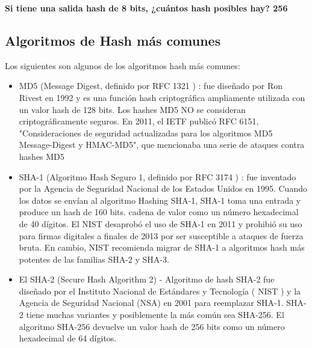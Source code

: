 \textbf{Si tiene una salida hash de 8 bits, ¿cuántos hash posibles hay? 256
}

\subsection{Algoritmos de Hash más comunes}

Los siguientes son algunos de los algoritmos hash más comunes: 
\begin{itemize}
    \item MD5 (Message Digest, definido por  RFC 1321 ) : fue diseñado por Ron Rivest en 1992 y es una función hash criptográfica ampliamente utilizada con un valor hash de 128 bits. Los hashes MD5 NO se consideran criptográficamente seguros. En 2011, el IETF publicó RFC 6151, "Consideraciones de seguridad actualizadas para los algoritmos MD5 Message-Digest y HMAC-MD5", que mencionaba una serie de ataques contra hashes MD5
\item SHA-1 (Algoritmo Hash Seguro 1, definido por  RFC 3174 ) :  fue inventado por la Agencia de Seguridad Nacional de los Estados Unidos en 1995.  Cuando los datos se envían al algoritmo Hashing SHA-1, SHA-1 toma una entrada y produce un hash de 160 bits. cadena de valor como un número hexadecimal de 40 dígitos. El NIST desaprobó el uso de SHA-1 en 2011 y prohibió su uso para firmas digitales a finales de 2013 por ser susceptible a ataques de fuerza bruta. En cambio, NIST recomienda migrar de SHA-1 a algoritmos hash más potentes de las familias SHA-2 y SHA-3.
\item El SHA-2 (Secure Hash Algorithm 2) - Algoritmo de hash SHA-2 fue diseñado por el Instituto Nacional de Estándares y Tecnología ( NIST ) y la Agencia de Seguridad Nacional (NSA) en 2001 para reemplazar SHA-1. SHA-2 tiene muchas variantes y posiblemente la más común sea SHA-256. El algoritmo SHA-256 devuelve un valor hash de 256 bits como un número hexadecimal de 64 dígitos. 

\end{itemize}




